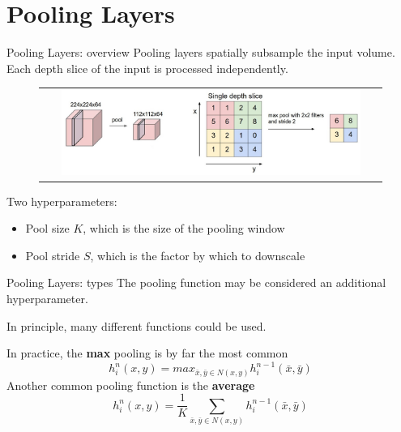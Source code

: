 \documentclass[aspectratio=169]{beamer}
\begin{document}


\section*{Pooling Layers}

\begin{frame}{Pooling Layers: overview}
Pooling layers spatially subsample the input volume.\\
Each depth slice of the input is processed independently.\\
\begin{figure}
\begin{tabular}{c}
\includegraphics[width=0.90\textwidth]{img/cnn/pool.jpg}
\end{tabular}
\end{figure}
Two hyperparameters:
\begin{itemize}
\item Pool size $K$, which is the size of the pooling window
\item Pool stride $S$, which is the factor by which to downscale
\end{itemize}
\end{frame}


\begin{frame}{Pooling Layers: types}
The pooling function may be considered an additional hyperparameter.

In principle, many different functions could be used.

In practice, the \textbf{max} pooling is by far the most common
\begin{equation*}
h^n_i(x, y) = max_{\bar{x},\bar{y} \in N(x, y)}h^{n-1}_{i}(\bar{x},\bar{y})
\end{equation*}
Another common pooling function is the \textbf{average}
\begin{equation*}
h^n_i(x, y) = \frac{1}{K}\sum_{\bar{x},\bar{y} \in N(x, y)}h^{n-1}_{i}(\bar{x},\bar{y})
\end{equation*}
\end{frame}
\end{document}
